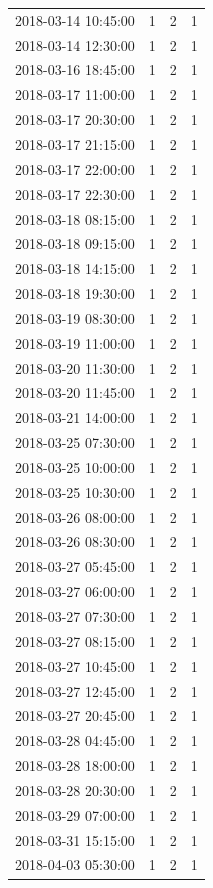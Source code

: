 \begin{tabular}{lrrr}
2018-03-14 10:45:00 & 1 & 2 & 1 \\
2018-03-14 12:30:00 & 1 & 2 & 1 \\
2018-03-16 18:45:00 & 1 & 2 & 1 \\
2018-03-17 11:00:00 & 1 & 2 & 1 \\
2018-03-17 20:30:00 & 1 & 2 & 1 \\
2018-03-17 21:15:00 & 1 & 2 & 1 \\
2018-03-17 22:00:00 & 1 & 2 & 1 \\
2018-03-17 22:30:00 & 1 & 2 & 1 \\
2018-03-18 08:15:00 & 1 & 2 & 1 \\
2018-03-18 09:15:00 & 1 & 2 & 1 \\
2018-03-18 14:15:00 & 1 & 2 & 1 \\
2018-03-18 19:30:00 & 1 & 2 & 1 \\
2018-03-19 08:30:00 & 1 & 2 & 1 \\
2018-03-19 11:00:00 & 1 & 2 & 1 \\
2018-03-20 11:30:00 & 1 & 2 & 1 \\
2018-03-20 11:45:00 & 1 & 2 & 1 \\
2018-03-21 14:00:00 & 1 & 2 & 1 \\
2018-03-25 07:30:00 & 1 & 2 & 1 \\
2018-03-25 10:00:00 & 1 & 2 & 1 \\
2018-03-25 10:30:00 & 1 & 2 & 1 \\
2018-03-26 08:00:00 & 1 & 2 & 1 \\
2018-03-26 08:30:00 & 1 & 2 & 1 \\
2018-03-27 05:45:00 & 1 & 2 & 1 \\
2018-03-27 06:00:00 & 1 & 2 & 1 \\
2018-03-27 07:30:00 & 1 & 2 & 1 \\
2018-03-27 08:15:00 & 1 & 2 & 1 \\
2018-03-27 10:45:00 & 1 & 2 & 1 \\
2018-03-27 12:45:00 & 1 & 2 & 1 \\
2018-03-27 20:45:00 & 1 & 2 & 1 \\
2018-03-28 04:45:00 & 1 & 2 & 1 \\
2018-03-28 18:00:00 & 1 & 2 & 1 \\
2018-03-28 20:30:00 & 1 & 2 & 1 \\
2018-03-29 07:00:00 & 1 & 2 & 1 \\
2018-03-31 15:15:00 & 1 & 2 & 1 \\
2018-04-03 05:30:00 & 1 & 2 & 1 \\

\end{tabular}
